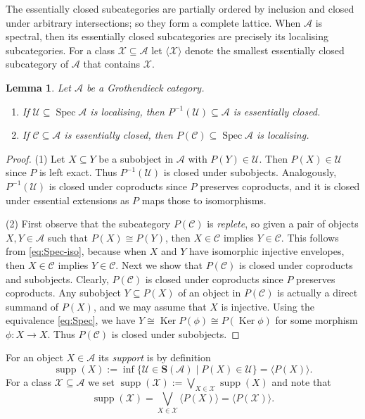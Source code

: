\documentclass[a4paper]{amsart}
\theoremstyle{plain}
\newtheorem{lem}[thm]{Lemma}
\theoremstyle{definition}
\theoremstyle{remark}
\numberwithin{equation}{section}
\newcommand{\Ker}{\operatorname{Ker}}
\newcommand{\Spec}{\operatorname{Spec}}
\newcommand{\supp}{\operatorname{supp}}
\def\A{\mathcal A}
\def\C{\mathcal C}
\def\U{\mathcal U}
\def\X{\mathcal X}
\def\bfS{\mathbf S}
\def\p{\phi}
\begin{document}
The essentially closed subcategories are partially ordered by inclusion and
closed under arbitrary intersections; so they form a complete
lattice. When $\A$ is spectral, then its essentially closed subcategories are
precisely its localising subcategories. For a class $\X\subseteq\A$ let
$\langle \X\rangle$ denote the smallest essentially closed subcategory of $\A$
that contains $\X$.

\begin{lem}\label{le:spectral}
    Let $\A$ be a Grothendieck category.
  \begin{enumerate}
\item  If $\U\subseteq\Spec\A$ is localising, then
  $P^{-1}(\U)\subseteq\A$ is  essentially closed.
\item If $\C\subseteq\A$ is essentially closed, then $P(\C)\subseteq\Spec\A$ is localising.
  \end{enumerate}
\end{lem}
\begin{proof}
  (1) Let $X\subseteq Y$ be a subobject in $\A$ with $P(Y)\in\U$. Then
  $P(X)\in\U$ since $P$ is left exact. Thus $P^{-1}(\U)$ is closed
  under subobjects. Analogously, $P^{-1}(\U)$ is closed under
  coproducts since $P$ preserves coproducts, and it is closed under
  essential extensions as $P$ maps those to isomorphisms.

  (2) First observe that the subcategory $P(\C)$ is \emph{replete}, so given a pair of
  objects $X,Y\in\A$ such that $P(X)\cong P(Y)$, then $X\in\C$ implies
  $Y\in\C$. This follows from \eqref{eq:Spec-iso}, because when $X$
  and $Y$ have isomorphic injective envelopes, then $X\in\C$ implies
  $Y\in\C$.  Next we show that $P(\C)$ is closed under coproducts and
  subobjects. Clearly, $P(\C)$ is closed under coproducts since $P$
  preserves coproducts.  Any subobject $Y\subseteq P(X)$ of an object
  in $P(\C)$ is actually a direct summand of $P(X)$, and we may
  assume that $X$ is injective.  Using the equivalence
  \eqref{eq:Spec}, we have $Y\cong \Ker P(\p)\cong P(\Ker\p)$ for some
  morphism $\p\colon X\to X$. Thus $P(\C)$ is closed under subobjects.
\end{proof}

For an object $X\in\A$ its \emph{support} is by definition
\begin{equation}\label{eq:supp}
  \supp(X):=\inf\{\U\in\bfS(\A)\mid P(X)\in \U\}=\langle P(X)\rangle.
\end{equation}
For a class $\X\subseteq\A$ we set
$\supp(\X):=\bigvee_{X\in\X}\supp(X)$ and note that
\begin{equation}\label{le:supp-class}
   \supp(\X)=\bigvee_{X\in\X}\langle P(X)\rangle=\langle
    P(\X)\rangle.
\end{equation}
\end{document}
